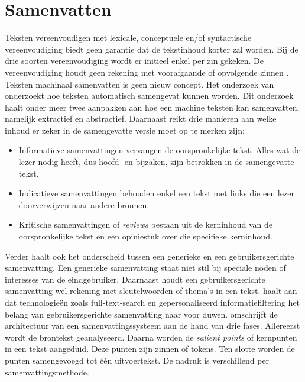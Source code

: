 \section{Samenvatten}

Teksten vereenvoudigen met lexicale, conceptuele en/of syntactische vereenvoudiging biedt geen garantie dat de tekstinhoud korter zal worden. Bij de drie soorten vereenvoudiging wordt er initieel enkel per zin gekeken. De vereenvoudiging houdt geen rekening met voorafgaande of opvolgende zinnen \autocite{DuBay2004}. Teksten machinaal samenvatten is geen nieuw concept. Het onderzoek van \textcite{Hahn2000} onderzoekt hoe teksten automatisch samengevat kunnen worden. Dit onderzoek haalt onder meer twee aanpakken aan hoe een machine teksten kan samenvatten, namelijk extractief en abstractief. Daarnaast reikt \textcite{Hahn2000} drie manieren aan welke inhoud er zeker in de samengevatte versie moet op te merken zijn:

\begin{itemize}
	\item Informatieve samenvattingen vervangen de oorspronkelijke tekst. Alles wat de lezer nodig heeft, dus hoofd- en bijzaken, zijn betrokken in de samengevatte tekst.
	\item Indicatieve samenvattingen behouden enkel een tekst met links die een lezer doorverwijzen naar andere bronnen. 
	\item Kritische samenvattingen of \textit{reviews} bestaan uit de kerninhoud van de oorspronkelijke tekst en een opiniestuk over die specifieke kerninhoud.
\end{itemize}

Verder haalt \textcite{Hahn2000} ook het onderscheid tussen een generieke en een gebruikersgerichte samenvatting. Een generieke samenvatting staat niet stil bij speciale noden of interesses van de eindgebruiker. Daarnaast houdt een gebruikersgerichte samenvatting wel rekening met sleutelwoorden of thema's in een tekst. \textcite{Hahn2000} haalt aan dat technologieën zoals full-text-search en gepersonaliseerd informatiefiltering het belang van gebruikersgerichte samenvatting naar voor duwen. \textcite{Hahn2000} omschrijft de architectuur van een samenvattingssysteem aan de hand van drie fases. Allereerst wordt de brontekst geanalyseerd. Daarna worden de \textit{salient points} of kernpunten in een tekst aangeduid. Deze punten zijn zinnen of tokens. Ten slotte worden de punten samengevoegd tot één uitvoertekst. De nadruk is verschillend per samenvattingsmethode.

